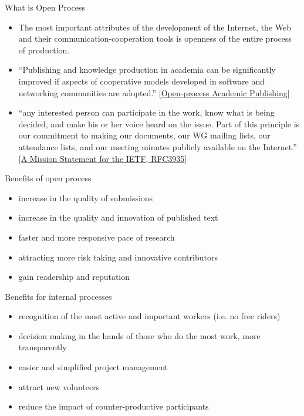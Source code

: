 \begin{frame}{What is Open Process}{}

\begin{itemize}
\item The most important attributes of the development of the
  Internet, the Web and their communication-cooperation tools is
  openness of the entire process of production.

\item ``Publishing and knowledge production in academia can be
  significantly improved if aspects of cooperative models developed in
  software and networking communities are adopted.'' \scriptsize
  [\href{http://hackthestate.org/2009/12/16/open-process-academic-publishing-v1-2/}{Open-process
    Academic Publishing}]

\item ``any interested person can participate in the work, know what
  is being decided, and make his or her voice heard on the issue. Part
  of this principle is our commitment to making our documents, our WG
  mailing lists, our attendance lists, and our meeting minutes
  publicly available on the Internet.'' \scriptsize
  [\href{http://tools.ietf.org/html/rfc3935}{A Mission Statement for the IETF, RFC3935}]

\end{itemize}
\end{frame}

\begin{frame}{Benefits of open process}{}

\begin{itemize}
\item increase in the quality of submissions
\item increase in the quality and innovation of published text
\item faster and more responsive pace of research 
\item attracting more risk taking and innovative contributors 
\item gain readership and reputation 
\end{itemize}
\end{frame}

\begin{frame}{Benefits for internal processes}{}
\begin{itemize}
\item recognition of the most active and important workers (i.e. no free riders)
\item decision making in the hands of those who do the most work, more transparently
\item easier and simplified project management
\item attract new volunteers 
\item reduce the impact of counter-productive participants
\end{itemize}

\end{frame}


